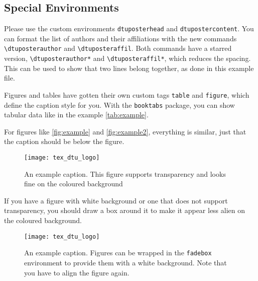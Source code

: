 \documentclass[
]{dtuposter}
\begin{document}
\begin{dtupostercontent}
\section{Special Environments}
Please use the custom environments \texttt{dtuposterhead} and 
\texttt{dtupostercontent}. You can format the list of authors and 
their affiliations with the new commands \texttt{\textbackslash dtuposterauthor}
and \texttt{\textbackslash dtuposteraffil}. Both commands have a starred version, 
\texttt{\textbackslash dtuposterauthor*} and \texttt{\textbackslash dtuposteraffil*}, 
which reduces the spacing. This can be used to show that two lines belong together, as
done in this example file.

Figures and tables have gotten their own custom tags \texttt{table} and 
\texttt{figure}, which define the caption style for you. With the \texttt{booktabs}
package, you can show tabular data like in the example \autoref{tab:example}.

For figures like \autoref{fig:example} and \autoref{fig:example2}, everything is 
similar, just that the caption should be below the figure. 

\begin{figure}
\texttt{[image: tex\_dtu\_logo]}
\caption{An example caption. This figure supports transparency and looks fine on 
the coloured background}\label{fig:example}
\end{figure}

If you have a figure with white background or one that does not support transparency,
you should draw a box around it to make it appear less alien on the coloured background.

\begin{figure}
  \begin{fadebox}\begin{center}
    \texttt{[image: tex\_dtu\_logo]}
  \end{center}\end{fadebox}
  \caption{An example caption. Figures can be wrapped in the \texttt{fadebox} 
environment to provide them with a white background. Note that you have to align the 
figure again.}\label{fig:example2}
\end{figure}

\end{dtupostercontent}
\end{document}
